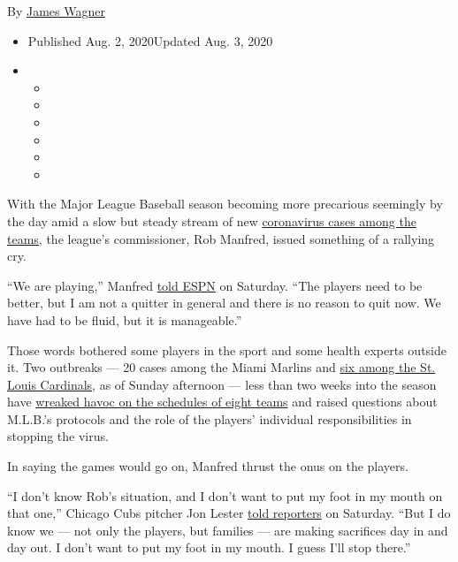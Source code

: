 By \href{https://www.nytimes3xbfgragh.onion/by/james-wagner}{James
Wagner}

\begin{itemize}
\item
  Published Aug. 2, 2020Updated Aug. 3, 2020
\item
  \begin{itemize}
  \item
  \item
  \item
  \item
  \item
  \item
  \end{itemize}
\end{itemize}

With the Major League Baseball season becoming more precarious seemingly
by the day amid a slow but steady stream of new
\href{https://www.nytimes3xbfgragh.onion/2020/08/03/sports/baseball/mlb-coronavirus-outbreak.html}{coronavirus
cases among the teams}, the league's commissioner, Rob Manfred, issued
something of a rallying cry.

``We are playing,'' Manfred
\href{https://twitter.com/karlravechespn/status/1289628827157581830}{told
ESPN} on Saturday. ``The players need to be better, but I am not a
quitter in general and there is no reason to quit now. We have had to be
fluid, but it is manageable.''

Those words bothered some players in the sport and some health experts
outside it. Two outbreaks --- 20 cases among the Miami Marlins and
\href{https://www.nytimes3xbfgragh.onion/2020/08/01/sports/baseball/coronavirus-cardinals.html}{six
among the St. Louis Cardinals}, as of Sunday afternoon --- less than two
weeks into the season have
\href{https://www.nytimes3xbfgragh.onion/2020/07/30/sports/baseball/phillies-blue-jays-postponed-coronavirus.html}{wreaked
havoc on the schedules of eight teams} and raised questions about
M.L.B.'s protocols and the role of the players' individual
responsibilities in stopping the virus.

In saying the games would go on, Manfred thrust the onus on the players.

``I don't know Rob's situation, and I don't want to put my foot in my
mouth on that one,'' Chicago Cubs pitcher Jon Lester
\href{https://theathletic.com/1968292/2020/08/02/at-a-time-like-this-jon-lester-isnt-going-to-blame-or-second-guess-the-players/}{told
reporters} on Saturday. ``But I do know we --- not only the players, but
families --- are making sacrifices day in and day out. I don't want to
put my foot in my mouth. I guess I'll stop there.''

